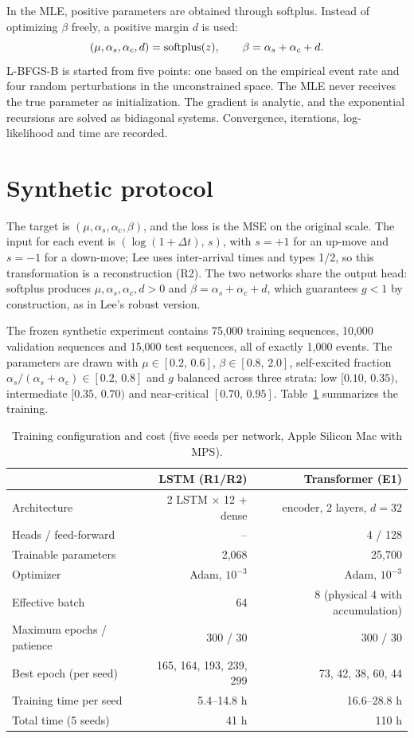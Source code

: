 In the MLE, positive parameters are obtained through softplus. Instead of optimizing \(\beta\)
freely, a positive margin \(d\) is used:
\[
(\mu,\alpha_s,\alpha_c,d)=\operatorname{softplus}(z),\qquad
\beta=\alpha_s+\alpha_c+d.
\]
L-BFGS-B is started from five points: one based on the empirical event rate and four
random perturbations in the unconstrained space. The MLE never receives the true
parameter as initialization. The gradient is analytic, and the exponential
recursions are solved as bidiagonal systems. Convergence, iterations, log-likelihood
and time are recorded.

\section{Synthetic protocol}

The target is \((\mu,\alpha_s,\alpha_c,\beta)\), and the loss is the MSE on the
original scale. The input for each event is \((\log(1+\Delta t),\,s)\), with \(s=+1\)
for an up-move and \(s=-1\) for a down-move; Lee uses inter-arrival times and types
1/2, so this transformation is a reconstruction (R2). The two networks share the
output head: softplus produces \(\mu,\alpha_s,\alpha_c,d>0\) and
\(\beta=\alpha_s+\alpha_c+d\), which guarantees \(g<1\) by construction, as in Lee's
robust version.

The frozen synthetic experiment contains 75,000 training sequences, 10,000 validation
sequences and 15,000 test sequences, all of exactly 1,000 events. The parameters are
drawn with \(\mu\in[0.2,\,0.6]\), \(\beta\in[0.8,\,2.0]\), self-excited fraction
\(\alpha_s/(\alpha_s+\alpha_c)\in[0.2,\,0.8]\) and \(g\) balanced across three
strata: low \([0.10,\,0.35)\), intermediate \([0.35,\,0.70)\) and near-critical
\([0.70,\,0.95]\). Table~\ref{tab:treino} summarizes the training.

\begin{table}[htbp]
\centering
\caption{Training configuration and cost (five seeds per network, Apple Silicon Mac
with MPS).}
\label{tab:treino}
\small
\begin{tabular}{lrr}
\toprule
 & LSTM (R1/R2) & Transformer (E1)\\
\midrule
Architecture & 2 LSTM $\times$ 12 + dense & encoder, 2 layers, $d=32$\\
Heads / feed-forward & -- & 4 / 128\\
Trainable parameters & 2,068 & 25,700\\
Optimizer & Adam, $10^{-3}$ & Adam, $10^{-3}$\\
Effective batch & 64 & 8 (physical 4 with accumulation)\\
Maximum epochs / patience & 300 / 30 & 300 / 30\\
Best epoch (per seed) & 165, 164, 193, 239, 299 & 73, 42, 38, 60, 44\\
Training time per seed & 5.4--14.8 h & 16.6--28.8 h\\
Total time (5 seeds) & 41 h & 110 h\\
\bottomrule
\end{tabular}
\end{table}

